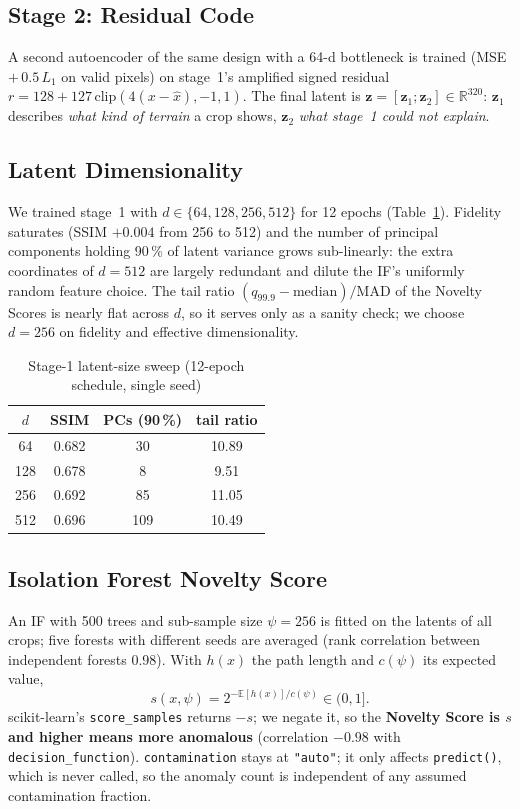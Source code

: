\documentclass[conference]{IEEEtran}
\begin{document}
\subsection{Stage 2: Residual Code}
A second autoencoder of the same design with a 64-d bottleneck is trained (MSE $+\,0.5\,L_1$ on valid
pixels) on stage~1's amplified signed residual $r = 128 + 127\,\mathrm{clip}(4(x-\hat{x}),-1,1)$. The
final latent is $\mathbf{z} = [\mathbf{z}_1;\mathbf{z}_2]\in\mathbb{R}^{320}$: $\mathbf{z}_1$ describes
\emph{what kind of terrain} a crop shows, $\mathbf{z}_2$ \emph{what stage~1 could not explain}.

\subsection{Latent Dimensionality}
We trained stage~1 with $d\in\{64,128,256,512\}$ for 12 epochs (Table~\ref{tab:sweep}). Fidelity saturates
(SSIM $+0.004$ from 256 to 512) and the number of principal components holding 90\,\% of latent variance
grows sub-linearly: the extra coordinates of $d=512$ are largely redundant and dilute the IF's uniformly
random feature choice. The tail ratio $(q_{99.9}-\mathrm{median})/\mathrm{MAD}$ of the Novelty Scores is
nearly flat across $d$, so it serves only as a sanity check; we choose $d=256$ on fidelity and effective
dimensionality.

\begin{table}[!t]
\centering
\caption{Stage-1 latent-size sweep (12-epoch schedule, single seed)}
\label{tab:sweep}
\footnotesize
\begin{tabular}{@{}cccc@{}}
\toprule
$d$ & SSIM & PCs (90\,\%) & tail ratio \\
\midrule
64 & 0.682 & 30 & 10.89 \\
128 & 0.678 & 8 & 9.51 \\
\rowcolor{yellow!20}256 & 0.692 & 85 & 11.05 \\
512 & 0.696 & 109 & 10.49 \\
\bottomrule
\end{tabular}
\end{table}

\subsection{Isolation Forest Novelty Score}
An IF \cite{liu2008} with 500 trees and sub-sample size $\psi=256$ is fitted on the latents of all crops;
five forests with different seeds are averaged (rank correlation between independent forests 0.98). With
$h(x)$ the path length and $c(\psi)$ its expected value,
\begin{equation}
s(x,\psi) = 2^{-\mathbb{E}[h(x)]/c(\psi)} \in (0,1].
\end{equation}
scikit-learn's \texttt{score\_samples} returns $-s$; we negate it, so the \textbf{Novelty Score is $s$ and
higher means more anomalous} (correlation $-0.98$ with \texttt{decision\_function}). \texttt{contamination}
stays at \texttt{"auto"}; it only affects \texttt{predict()}, which is never called, so the anomaly count
is independent of any assumed contamination fraction.
\end{document}
